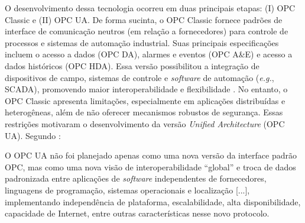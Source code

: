         O desenvolvimento dessa tecnologia ocorreu em duas principais etapas: (I) OPC Classic e (II) OPC UA. De forma sucinta, o OPC Classic fornece padrões de interface de comunicação neutros (em relação a fornecedores) para controle de processos e sistemas de automação industrial. Suas principais especificações incluem o acesso a dados (OPC DA), alarmes e eventos (OPC A\&E) e acesso a dados históricos (OPC HDA). Essa versão possibilitou a integração de dispositivos de campo, sistemas de controle e \textit{software} de automação (\textit{e.g.}, SCADA), promovendo maior interoperabilidade e flexibilidade \cite{han2022}. No entanto, o OPC Classic apresenta limitações, especialmente em aplicações distribuídas e heterogêneas, além de não oferecer mecanismos robustos de segurança. Essas restrições motivaram o desenvolvimento da versão \textit{Unified Architecture} (OPC UA). Segundo :
        
        \begin{citacao}
            O OPC UA não foi planejado apenas como uma nova versão da interface padrão OPC, mas como uma nova visão de interoperabilidade ``global'' e troca de dados padronizada entre aplicações de \textit{software} independentes de fornecedores, linguagens de programação, sistemas operacionais e localização [...], implementando independência de plataforma, escalabilidade, alta disponibilidade, capacidade de Internet, entre outras características nesse novo protocolo.
        \end{citacao}
        

